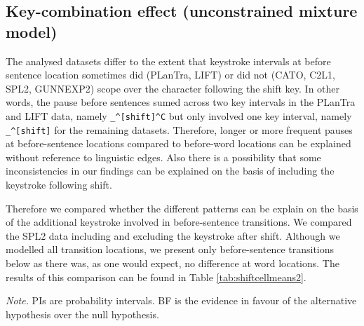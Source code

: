 \documentclass[
  english,
  man,floatsintext]{apa7}
\begin{document}
\begin{appendix}
\section{}
\hypertarget{key-combination-effect-unconstrained-mixture-model}{%
\subsection{Key-combination effect (unconstrained mixture
model)}\label{key-combination-effect-unconstrained-mixture-model}}

The analysed datasets differ to the extent that keystroke intervals at
before sentence location sometimes did (PLanTra, LIFT) or did not (CATO,
C2L1, SPL2, GUNNEXP2) scope over the character following the shift key.
In other words, the pause before sentences sumed across two key
intervals in the PLanTra and LIFT data, namely
\texttt{\_\^{}{[}shift{]}\^{}C} but only involved one key interval,
namely \texttt{\_\^{}{[}shift{]}} for the remaining datasets. Therefore,
longer or more frequent pauses at before-sentence locations compared to
before-word locations can be explained without reference to linguistic
edges. Also there is a possibility that some inconsistencies in our
findings can be explained on the basis of including the keystroke
following shift.

Therefore we compared whether the different patterns can be explain on
the basis of the additional keystroke involved in before-sentence
transitions. We compared the SPL2 data including and excluding the
keystroke after shift. Although we modelled all transition locations, we
present only before-sentence transitions below as there was, as one
would expect, no difference at word locations. The results of this
comparison can be found in Table \ref{tab:shiftcellmeans2}.

\begin{center}
\begin{ThreePartTable}

\begin{TableNotes}[para]
\normalsize{\textit{Note.} PIs are probability intervals. BF is the evidence in favour of the alternative hypothesis over the null hypothesis.}
\end{TableNotes}

\footnotesize{

}
\end{ThreePartTable}
\end{center}
\end{appendix}
\end{document}

